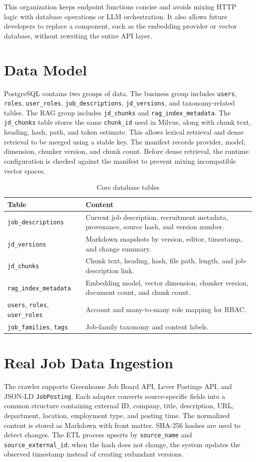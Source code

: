 \documentclass[12pt,a4paper,oneside]{report}
\newcommand{\code}[1]{\texttt{#1}}
\begin{document}
This organization keeps endpoint functions concise and avoids mixing HTTP logic with database operations or LLM orchestration. It also allows future developers to replace a component, such as the embedding provider or vector database, without rewriting the entire API layer.

\section{Data Model}
PostgreSQL contains two groups of data. The business group includes \code{users}, \code{roles}, \code{user\_roles}, \code{job\_descriptions}, \code{jd\_versions}, and taxonomy-related tables. The RAG group includes \code{jd\_chunks} and \code{rag\_index\_metadata}. The \code{jd\_chunks} table stores the same \code{chunk\_id} used in Milvus, along with chunk text, heading, hash, path, and token estimate. This allows lexical retrieval and dense retrieval to be merged using a stable key. The manifest records provider, model, dimension, chunker version, and chunk count. Before dense retrieval, the runtime configuration is checked against the manifest to prevent mixing incompatible vector spaces.

\begin{table}[H]
\centering
\caption{Core database tables}
\label{tab:database}
\begin{tabularx}{\textwidth}{p{3.7cm}X}
\toprule
\textbf{Table} & \textbf{Content}\\
\midrule
\code{job\_descriptions} & Current job description, recruitment metadata, provenance, source hash, and version number.\\
\code{jd\_versions} & Markdown snapshots by version, editor, timestamp, and change summary.\\
\code{jd\_chunks} & Chunk text, heading, hash, file path, length, and job-description link.\\
\code{rag\_index\_metadata} & Embedding model, vector dimension, chunker version, document count, and chunk count.\\
\code{users}, \code{roles}, \code{user\_roles} & Account and many-to-many role mapping for RBAC.\\
\code{job\_families}, \code{tags} & Job-family taxonomy and content labels.\\
\bottomrule
\end{tabularx}
\end{table}

\section{Real Job Data Ingestion}
The crawler supports Greenhouse Job Board API, Lever Postings API, and JSON-LD \code{JobPosting}. Each adapter converts source-specific fields into a common structure containing external ID, company, title, description, URL, department, location, employment type, and posting time. The normalized content is stored as Markdown with front matter. SHA-256 hashes are used to detect changes. The ETL process upserts by \code{source\_name} and \code{source\_external\_id}; when the hash does not change, the system updates the observed timestamp instead of creating redundant versions.
\end{document}
